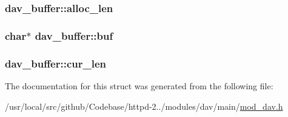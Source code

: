 \subsubsection[{\texorpdfstring{alloc\+\_\+len}{alloc_len}}]{ dav\+\_\+buffer\+::alloc\+\_\+len}\hypertarget{structdav__buffer_a08afb816368f6e602d8e0b9ffeebaaae}{}\label{structdav__buffer_a08afb816368f6e602d8e0b9ffeebaaae}
\subsubsection[{\texorpdfstring{buf}{buf}}]{\setlength{\rightskip}{0pt plus 5cm}char$\ast$ dav\+\_\+buffer\+::buf}\hypertarget{structdav__buffer_ab55f9f7e74cadc2abbc7f4fc99090f01}{}\label{structdav__buffer_ab55f9f7e74cadc2abbc7f4fc99090f01}
\subsubsection[{\texorpdfstring{cur\+\_\+len}{cur_len}}]{ dav\+\_\+buffer\+::cur\+\_\+len}\hypertarget{structdav__buffer_a8d43337c127b3e07aada116e7f3cb2a9}{}\label{structdav__buffer_a8d43337c127b3e07aada116e7f3cb2a9}


The documentation for this struct was generated from the following file\+:\begin{DoxyCompactItemize}
\item 
/usr/local/src/github/\+Codebase/httpd-\/2../modules/dav/main/\hyperlink{mod__dav_8h}{mod\+\_\+dav.\+h}\end{DoxyCompactItemize}
